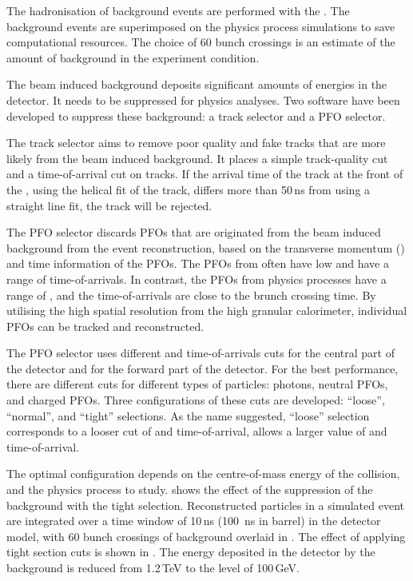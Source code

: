 The hadronisation of  \ggHad background events are performed with the \PYTHIA. The  \ggHad background events are superimposed on the physics process simulations to save computational resources. The choice of 60 bunch crossings is an estimate  of  the amount of background in the experiment condition\cite{Barklow:1443518}.

The beam induced background deposits significant amounts of energies in the detector. It needs to be suppressed for physics analyses. Two software have been developed to suppress these background: a track selector and a PFO selector\cite{Marshall:2012ry}.

The track selector aims to remove poor quality and fake tracks that are more likely from the beam induced background. It places a simple track-quality cut and a time-of-arrival cut on tracks. If the arrival time of the track at the front of the \ECAL, using the helical fit of the track, differs more than 50\,ns from using a straight line fit, the track will be rejected.


The PFO selector discards PFOs that are originated from the beam induced background from the event reconstruction, based on the transverse momentum (\pT) and time information of the PFOs. The PFOs from \ggHad often have low \pT and have a range of time-of-arrivals. In contrast, the PFOs from physics processes have a range of \pT, and the time-of-arrivals are close to the brunch crossing time. By utilising the high spatial resolution from the high granular calorimeter, individual PFOs can be tracked and reconstructed.

The PFO selector uses different \pT and time-of-arrivals cuts for the central part of the detector and for the forward part of the detector. For the best performance, there are different cuts for different types of particles: photons, neutral PFOs, and charged PFOs. Three configurations of these cuts are developed: ``loose'', ``normal'', and ``tight'' selections. As the name suggested, ``loose'' selection corresponds to a looser cut of \pT and time-of-arrival, allows a larger value of \pT and time-of-arrival.

The optimal configuration depends on the centre-of-mass energy of the collision, and the physics process to study.  shows the effect of the suppression of the background with the tight \PFO selection. Reconstructed particles  in a simulated \HepProcess{\Pep\Pem \to \PHiggs\PHiggs \to \Ptop\APbottom\Pbottom\APtop} event  are integrated over a time window of 10\,ns (100 \,ns in \HCAL barrel) in the \CLICILD detector model, with 60 bunch crossings of \ggHad background overlaid in . The effect of applying tight \PFO section cuts is shown in . The energy deposited in the detector by the background is reduced from 1.2\,TeV to the level of 100\,GeV.


